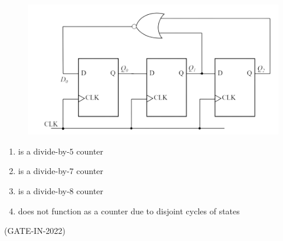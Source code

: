 \begin{enumerate}[label=\arabic*.,ref=\theenumi]
\begin{figure}[H]
  \centering
  \includegraphics[width=0.75\columnwidth]{ide/7474/figs/GATEIN202236.png}
  \caption{}
  \label{fig:GATEIN202236.png}
\end{figure}
 \begin{enumerate}
 \item is a divide-by-$5$ counter
 \item is a divide-by-$7$ counter
 \item is a divide-by-$8$ counter
 \item does not function as a counter due to disjoint cycles of states 
\end{enumerate}
\hfill(GATE-IN-2022)


\end{enumerate}
